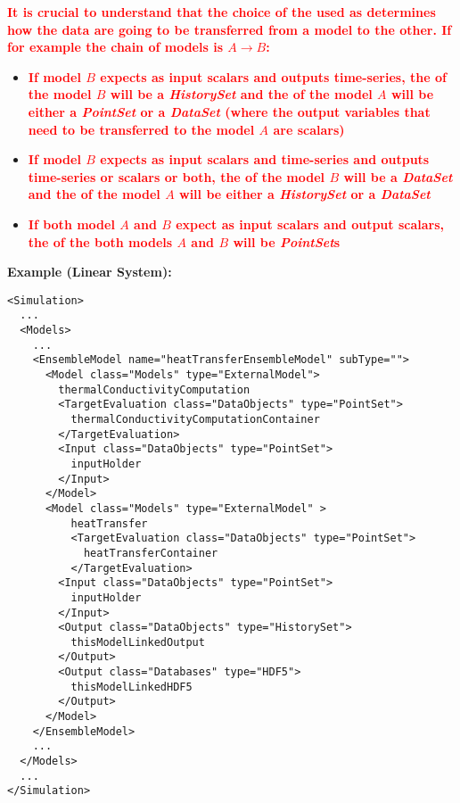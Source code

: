 \nb \textcolor{red} { \textbf{ It is crucial to understand that the choice of the  used as
 \newline {} determines how the data are going to be transferred from a model to
  the other. If for example the chain of models is $A \rightarrow B$:}}
\begin{itemize}
  \item \textcolor{red} { \textbf{ If model $B$ expects as input scalars and outputs time-series, the 
  of the  model $B$ will be a \textit{HistorySet} and the   of the model $A$ will be either
  a \textit{PointSet} or a \textit{DataSet} (where the output variables that need to be transferred to the model $A$ are scalars) }    }
   \item \textcolor{red} { \textbf{ If model $B$ expects as input scalars and time-series and outputs time-series or scalars or both, the 
  of the  model $B$ will be a \textit{DataSet} and the \newline  {} of the model $A$ will be either
  a \textit{HistorySet} or a \textit{DataSet}  }    }
  \item \textcolor{red} { \textbf{ If both model $A$ and $B$ expect as input scalars and output scalars, the 
  of the  both models  $A$  and $B$ will be  \textit{PointSet}s  }  }
\end{itemize}

\textbf{Example (Linear System):}
\begin{lstlisting}[style=XML,morekeywords={subType,debug,name,class,type}]
<Simulation>
  ...
  <Models>
    ...
    <EnsembleModel name="heatTransferEnsembleModel" subType="">
      <Model class="Models" type="ExternalModel">
        thermalConductivityComputation
        <TargetEvaluation class="DataObjects" type="PointSet">
          thermalConductivityComputationContainer
        </TargetEvaluation>
        <Input class="DataObjects" type="PointSet">
          inputHolder
        </Input>
      </Model>
      <Model class="Models" type="ExternalModel" >
          heatTransfer
          <TargetEvaluation class="DataObjects" type="PointSet">
            heatTransferContainer
          </TargetEvaluation>
        <Input class="DataObjects" type="PointSet">
          inputHolder
        </Input>
        <Output class="DataObjects" type="HistorySet">
          thisModelLinkedOutput
        </Output>
        <Output class="Databases" type="HDF5">
          thisModelLinkedHDF5
        </Output>
      </Model>
    </EnsembleModel>
    ...
  </Models>
  ...
</Simulation>
\end{lstlisting}

